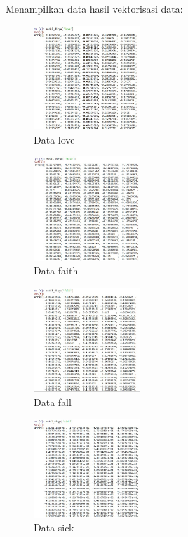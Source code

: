 \hfill\break

Menampilkan data hasil vektorisasi data:
\begin{figure}[H]
\includegraphics[width=4cm]{figures/1174067/5/hasil1-2.jpg}
\centering
\caption{Data love}
\end{figure}

\hfill\break
\begin{figure}[H]
\includegraphics[width=4cm]{figures/1174067/5/hasil1-3.jpg}
\centering
\caption{Data faith}
\end{figure}

\hfill\break
\begin{figure}[H]
\includegraphics[width=4cm]{figures/1174067/5/hasil1-4.jpg}
\centering
\caption{Data fall}
\end{figure}

\hfill\break
\begin{figure}[H]
\includegraphics[width=4cm]{figures/1174067/5/hasil1-5.jpg}
\centering
\caption{Data sick}
\end{figure}

